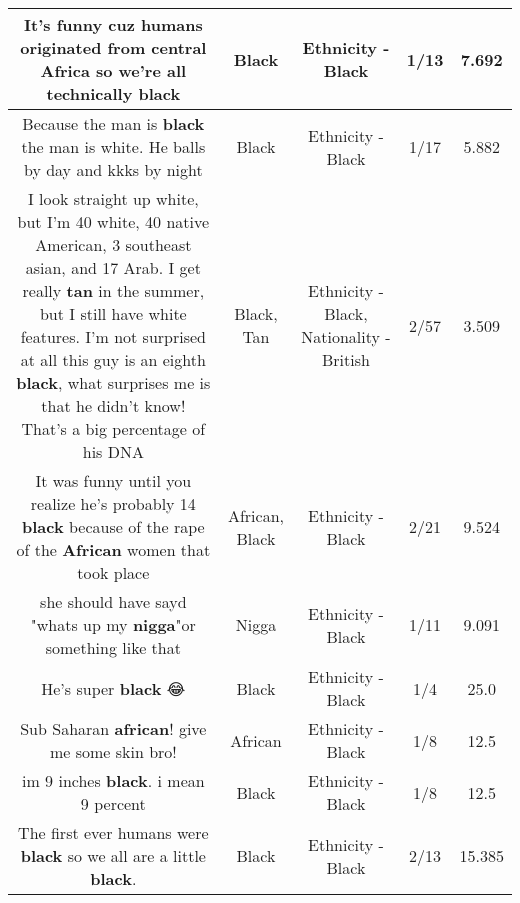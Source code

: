 \documentclass[11pt]{article}
\newlength\mylength
\begin{document}
\begin{center}
\begin{longtable}{|C{.65\mylength}|C{.30\mylength}|C{.12\mylength}|C{.12\mylength}|C{.12\mylength}|}
  \small It's funny cuz humans originated from central Africa so we're all technically black\normalsize   & Black & Ethnicity - Black & 1/13 & 7.692 \\  \hline
  \small Because the man is \textbf{black} the man is white. He balls by day and kkks by night\normalsize   & Black & Ethnicity - Black & 1/17 & 5.882 \\  \hline
  \small I look straight up white, but I'm 40 white, 40 native American, 3 southeast asian, and 17 Arab. I get really \textbf{tan} in the summer, but I still have white features. I'm not surprised at all this guy is an eighth \textbf{black}, what surprises me is that he didn't know! That's a big percentage of his DNA\normalsize   & Black, Tan & Ethnicity - Black, Nationality - British & 2/57 & 3.509 \\  \hline
  \small It was funny until you realize he's probably 14 \textbf{black} because of the rape of the \textbf{African} women that took place\normalsize   & African, Black & Ethnicity - Black & 2/21 & 9.524 \\  \hline
  \small she should have sayd "whats up my \textbf{nigga}"or something like that\normalsize   & Nigga & Ethnicity - Black & 1/11 & 9.091 \\  \hline
  \small He's super \textbf{black} 😂\normalsize   & Black & Ethnicity - Black & 1/4 & 25.0 \\  \hline
  \small Sub Saharan \textbf{african}!  give me some skin bro!\normalsize   & African & Ethnicity - Black & 1/8 & 12.5 \\  \hline
  \small im 9 inches \textbf{black}.  i mean 9 percent\normalsize   & Black & Ethnicity - Black & 1/8 & 12.5 \\  \hline
  \small The first ever humans were \textbf{black} so we all are a little \textbf{black}.\normalsize   & Black & Ethnicity - Black & 2/13 & 15.385 \\  \hline

\end{longtable}
\end{center}
\end{document}
